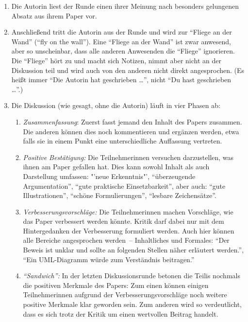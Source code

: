 \begin{enumerate}
\item Die Autorin liest der Runde einen ihrer Meinung nach besonders
gelungenen Absatz aus ihrem Paper vor.

\item Anschließend tritt die Autorin aus der Runde und wird zur "`Fliege an
der Wand"' ("`fly on the wall"'). Eine "`Fliege an der Wand"' ist zwar
anwesend, aber so unscheinbar, dass alle anderen Anwesenden
die "`Fliege"' ignorieren. Die "`Fliege"' hört zu und macht sich Notizen, nimmt aber
nicht an der Diskussion teil und wird auch von den anderen nicht direkt
angesprochen. (Es heißt immer "`Die Autorin hat geschrieben \ldots"', nicht "`Du
hast geschrieben \ldots"'.)

\item Die Diskussion (wie gesagt, ohne die Autorin) läuft in vier Phasen ab:

\begin{enumerate}
\item \emph{Zusammenfassung}: Zuerst fasst jemand den Inhalt des Papers zusammen.
Die anderen können dies noch kommentieren und ergänzen werden, etwa falls 
sie in einem Punkt eine unterschiedliche Auffassung vertreten.

\item \emph{Positive Bestätigung:} Die Teilnehmerinnen versuchen
darzustellen, was ihnen am Paper gefallen hat. Dies kann sowohl Inhalt
als auch Darstellung umfassen: "'neue Erkenntnis"', "`überzeugende
Argumentation"', "`gute praktische Einsetzbarkeit"', aber auch: "`gute
Illustrationen"', "`schöne Formulierungen"', "`lesbare Zeichensätze"'.

\item \emph{Verbesserungsvorschläge:} Die Teilnehmerinnen machen
Vorschläge, wie das Paper verbessert werden könnte. Kritik darf
dabei nur mit dem Hintergedanken der Verbesserung formuliert werden.
Auch hier können alle Bereiche angesprochen werden~-- Inhaltliches und
Formales: "`Der Beweis ist unklar und sollte an folgenden Stellen
näher erläutert werden."', "`Ein UML-Diagramm würde zum Verständnis
beitragen."'

\item \emph{"`Sandwich"':} In der letzten Diskussionsrunde betonen die Teilis nochmals die
positiven Merkmale des Papers: Zum einen können einigen
Teilnehmerinnen aufgrund der Verbesserungsvorschläge noch weitere positive
Merkmale klar geworden sein. Zum anderen wird so verdeutlicht, dass es
sich trotz der Kritik um einen wertvollen Beitrag handelt.
\end{enumerate}


\end{enumerate}
